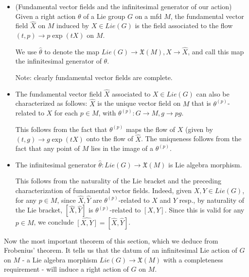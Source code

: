 \documentclass{report}
\theoremstyle{definition}
\begin{document}
\begin{itemize}
    \item (Fundamental vector fields and the infinitesimal generator of our action) Given a right action $\theta$ of a Lie group $G$ on a mfd $M$, the fundamental vector field $\hat{X}$ on $M$ induced by $X\in Lie(G)$ is the field associated to the flow $(t,p)\to p\exp(tX)$ on $M$.

    We use $\hat{\theta}$ to denote the map $Lie(G)\to\mathfrak{X}(M),X\to\hat{X}$, and call this map the infinitesimal generator of $\theta$.

    Note: clearly fundamental vector fields are complete.
    \item The fundamental vector field $\hat{X}$ associated to $X\in Lie(G)$ can also be characterized as follows: $\hat{X}$ is the unique vector field on $M$ that is $\theta^{(p)}$-related to $X$ for each $p\in M$, with $\theta^{(p)}:G\to M,g\to pg$.

    This follows from the fact that $\theta^{(p)}$ maps the flow of $X$ (given by $(t,g)\to g\exp(tX)$ onto the flow of $\hat{X}$. The uniqueness follows from the fact that any point of $M$ lies in the image of a $\theta^{(p)}$.
    \item The infinitesimal generator $\hat{\theta}:Lie(G)\to\mathfrak{X}(M)$ is Lie algebra morphism.

    This follows from the naturality of the Lie bracket and the preceding characterization of fundamental vector fields. Indeed, given $X,Y\in Lie(G)$, for any $p\in M$, since $\hat{X},\hat{Y}$ are $\theta^{(p)}$-related to $X$ and $Y$ resp., by naturality of the Lie bracket, $[\hat{X},\hat{Y}]$ is $\theta^{(p)}$-related to $[X,Y]$. Since this is valid for any $p\in M$, we conclude $\hat{[X,Y]}=[\hat{X},\hat{Y}]$.
\end{itemize}

Now the most important theorem of this section, which we deduce from Frobenius' theorem. It tells us that the datum of an infinitesimal Lie action of $G$ on $M$ - a Lie algebra morphism $Lie(G)\to\mathfrak{X}(M)$ with a completeness requirement - will induce a right action of $G$ on $M$.
\end{document}
